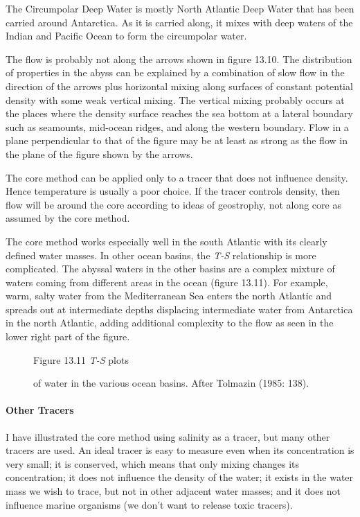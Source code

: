 The Circumpolar Deep Water is mostly North
Atlantic Deep Water that has been carried around Antarctica. As it is carried along,
it mixes with deep waters of the Indian and Pacific Ocean to form the circumpolar
water.

The flow is probably not along the arrows shown in figure 13.10. The
distribution of properties in the abyss can be explained by a combination
of slow flow in the direction of the arrows plus horizontal mixing along surfaces of constant potential density with some weak vertical
mixing. The vertical mixing probably
occurs at the places where the density surface reaches the sea bottom at a lateral boundary
such as seamounts, mid-ocean ridges, and along the western boundary. Flow in a plane
perpendicular to that of the figure may be at least as strong as the flow in the plane of the
figure shown by the arrows.

The core method can be applied only to a tracer that does not influence density. Hence temperature is usually a poor choice. If the tracer controls den\-sity, then flow will be around the core according to ideas of geostrophy, not along core as assumed by the core method.

The core method works especially well in the south Atlantic with its clearly
defined water masses. In other ocean basins, the \textit{T-S} relationship is
more complicated. The abyssal waters in the other basins are a complex mixture
of waters coming from different areas in the ocean (figure 13.11). For example,
warm, salty water from the Mediterranean Sea enters the north Atlantic and
spreads out at intermediate depths displacing intermediate water from
Antarctica in the north Atlantic, adding additional complexity to the flow as
seen in the lower right part of the figure.

\begin{figure}[t!]
\centering
{}
\footnotesize
Figure 13.11 \textit{T-S} plots \rule{0pt}{3ex}of water in the
various ocean basins. After Tolmazin (1985: 138).

\label{fig:TSplots}
\vspace{-3ex}
\end{figure}

\paragraph{Other Tracers}
I have illustrated the core method using
salinity as a tracer, but many other tracers are used. An ideal tracer is easy to
measure even when its concentration is very small; it is conserved, which means that
only mixing changes its concentration; it does not influence the
density of the water; it exists in the water mass we wish to trace, but not in other adjacent
water masses; and it does not influence marine organisms (we don't want to release toxic
tracers).

